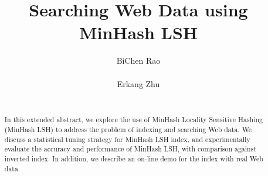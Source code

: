 \documentclass{sig-alternate}
\begin{document}
\title{Searching Web Data using MinHash LSH}
%
%
%
%
%

%
\author{
%
%
\alignauthor
BiChen Rao\\
       \\
\alignauthor
Erkang Zhu\\
       \\
}

\maketitle
\begin{abstract}
In this extended abstract, we explore the use of MinHash Locality Sensitive Hashing
(MinHash LSH) to address the problem of indexing and searching Web data.
We discuss a statistical tuning strategy for MinHash LSH index, and
experimentally evaluate the accuracy and performance of MinHash LSH, with comparison against inverted index.
In addition, we describe an on-line demo for the 
index with real Web data.
\end{abstract}
\end{document}

